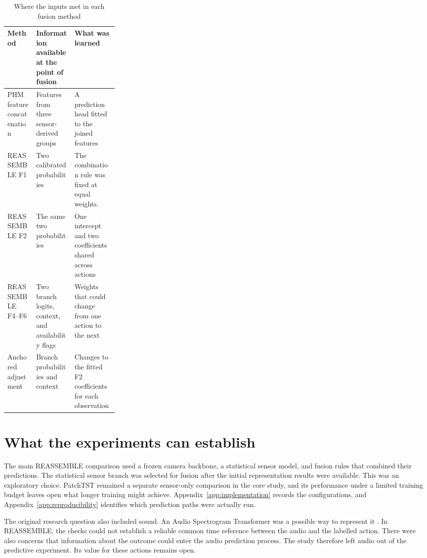 \begin{table}[htbp]
\centering
\caption{Where the inputs met in each fusion method}
\label{tab:ch3-fusion-interfaces}
\small\singlespacing
\setlength{\tabcolsep}{4pt}
\renewcommand{\arraystretch}{1.15}
\begin{tabularx}{\linewidth}{@{}P{0.26\linewidth}YY@{}}
\toprule
\textbf{Method} & \textbf{Information available at the point of fusion} & \textbf{What was learned} \\
\midrule
PHM feature concatenation & Features from three sensor-derived groups & A prediction head fitted to the joined features \\
REASSEMBLE F1 & Two calibrated probabilities & The combination rule was fixed at equal weights. \\
REASSEMBLE F2 & The same two probabilities & One intercept and two coefficients shared across actions \\
REASSEMBLE F4--F6 & Two branch logits, context, and availability flags & Weights that could change from one action to the next \\
Anchored adjustment & Branch probabilities and context & Changes to the fitted F2 coefficients for each observation \\
\bottomrule
\end{tabularx}
\end{table}

\section{What the experiments can establish}

The main REASSEMBLE comparison used a frozen camera backbone, a statistical sensor model, and fusion rules that combined their predictions. The statistical sensor branch was selected for fusion after the initial representation results were available. This was an exploratory choice. PatchTST remained a separate sensor-only comparison in the core study, and its performance under a limited training budget leaves open what longer training might achieve. Appendix~\ref{app:implementation} records the configurations, and Appendix~\ref{app:reproducibility} identifies which prediction paths were actually run.

The original research question also included sound. An Audio Spectrogram Transformer was a possible way to represent it \parencite{P011}. In REASSEMBLE, the checks could not establish a reliable common time reference between the audio and the labelled action. There were also concerns that information about the outcome could enter the audio prediction process. The study therefore left audio out of the predictive experiment. Its value for these actions remains open.

